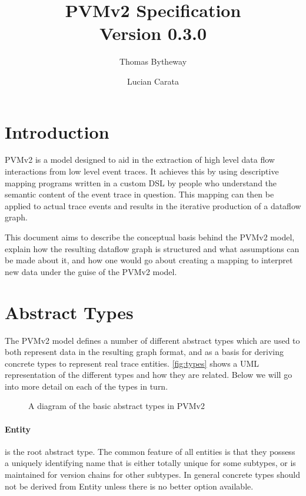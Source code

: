 \documentclass[12pt,twoside,a4paper]{article}
\newcommand{\para}[1]{\paragraph{#1\\}}
\begin{document}
\title{PVMv2 Specification\\\normalsize Version 0.3.0}
\author{Thomas Bytheway \and Lucian Carata}

\maketitle

\clearpage

\section{Introduction}
\label{sec:intro}
PVMv2 is a model designed to aid in the extraction of high level data flow interactions from low level event traces. It achieves this by using descriptive mapping programs written in a custom DSL by people who understand the semantic content of the event trace in question. This mapping can then be applied to actual trace events and results in the iterative production of a dataflow graph.

This document aims to describe the conceptual basis behind the PVMv2 model, explain how the resulting dataflow graph is structured and what assumptions can be made about it, and how one would go about creating a mapping to interpret new data under the guise of the PVMv2 model.

\section{Abstract Types}
\label{sec:ty}
The PVMv2 model defines a number of different abstract types which are used to both represent data in the resulting graph format, and as a basis for deriving concrete types to represent real trace entities. \autoref{fig:types} shows a UML representation of the different types and how they are related. Below we will go into more detail on each of the types in turn.

\begin{figure}[h]
\centering

\caption{A diagram of the basic abstract types in PVMv2}
\label{fig:types}
\end{figure}

\para{Entity}
\label{sec:ty:entity}
 is the root abstract type. The common feature of all entities is that they possess a uniquely identifying name that is either totally unique for some subtypes, or is maintained for version chains for other subtypes. In general concrete types should not be derived from Entity unless there is no better option available.
\end{document}
